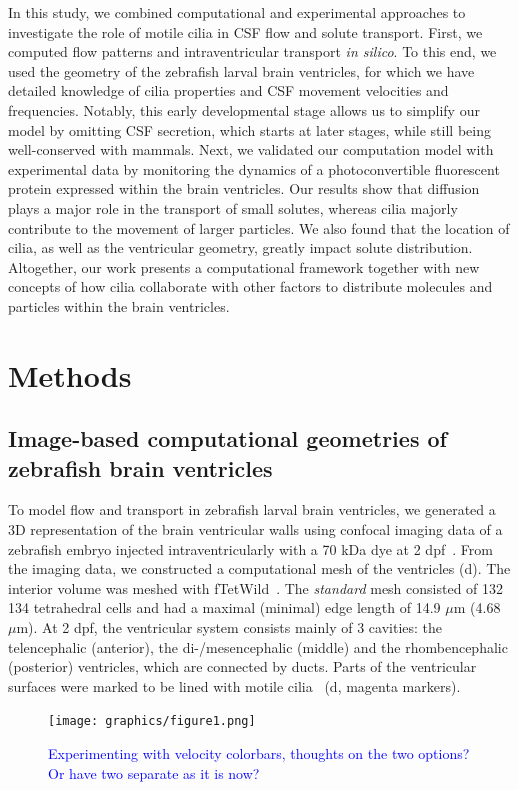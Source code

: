 \documentclass[fleqn]{wlscirep}
\newcommand{\lyng}[1]{\textcolor{blue}{#1}}
\begin{document}
In this study, we combined computational and experimental approaches to investigate
the role of motile cilia in CSF flow and solute transport.
First, we computed flow patterns and intraventricular transport \emph{in silico}. To
this end, we used the geometry of the zebrafish larval brain ventricles,
for which we have detailed knowledge of cilia properties and CSF movement velocities
and frequencies. Notably, this early developmental stage allows us to simplify our model
by omitting CSF secretion, which starts at later stages, while still being well-conserved with mammals.
Next, we validated our computation model with experimental data by monitoring
the dynamics of a photoconvertible fluorescent protein expressed within the brain ventricles.
Our results show that diffusion plays a major role in the transport of small solutes,
whereas cilia majorly contribute to the movement of larger particles.
We also found that the location of cilia, as well as the ventricular geometry, greatly
impact solute distribution. Altogether, our work presents a computational
framework together with new concepts of how cilia
collaborate with other factors to distribute molecules and
particles within the brain ventricles. 

\section*{Methods}
\subsection*{Image-based computational geometries of zebrafish brain ventricles}
To model flow and transport in zebrafish larval brain ventricles, we generated a
3D representation of the brain ventricular walls using confocal imaging data of a zebrafish embryo
injected intraventricularly with a 70 kDa dye at 2 dpf~\cite{Olstad2019CiliaryDevelopment}. 
From the imaging data, we constructed a computational mesh of the ventricles (d).
The interior volume was meshed with fTetWild~\cite{Hu2020FastWild}. 
The \emph{standard} mesh consisted of 132 134 tetrahedral cells and had a
maximal (minimal) edge length of 14.9 $\mu$m (4.68 $\mu$m). 
At 2 dpf, the ventricular system consists mainly of 3 cavities: the telencephalic (anterior),
the di-/mesencephalic (middle) and the rhombencephalic (posterior) ventricles, which are connected by ducts. 
Parts of the ventricular surfaces were marked to be lined with
motile cilia~\cite{Olstad2019CiliaryDevelopment} (d, magenta markers).
\begin{figure}%
    \centering
    \texttt{[image: graphics/figure1.png]}
    \caption{\lyng{Experimenting with velocity colorbars, thoughts on the
    two options? Or have two separate as it is now?}}
    \label{fig:figure1}
\end{figure}
\end{document}

